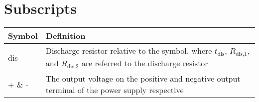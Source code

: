 \section*{Subscripts}

\begin{longtable}{p{2.5cm}p{8cm}}
    \toprule
    Symbol & Definition \\
    \midrule\endhead %
    dis &  Discharge resistor relative to the symbol, where $t_{\text{dis}}$, $R_{\text{dis,1}}$, and $R_{\text{dis,2}}$ are referred to the discharge resistor\\
    + \& - & The output voltage on the positive and negative output terminal of the power supply respective\\
    \bottomrule
\end{longtable}